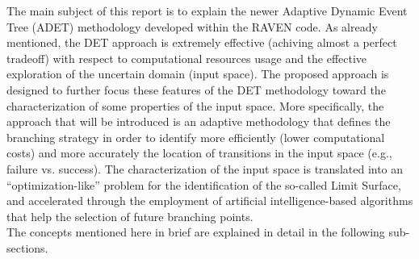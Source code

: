 \label{sec:DETRavenApproach}
The main subject of this report is to explain the newer Adaptive Dynamic Event Tree (ADET) methodology developed within the RAVEN code. As already mentioned, the DET approach is extremely effective (achiving almost a perfect tradeoff) with respect to computational resources usage and the effective exploration of the uncertain domain (input space). The proposed approach is designed to further focus these features of the DET methodology toward the characterization of some properties of the input space. More specifically, the approach that will be introduced is an adaptive methodology that defines the branching strategy in order to identify more efficiently (lower computational costs) and more accurately the location of transitions in the input space (e.g., failure vs. success). The characterization of the input space is translated into an “optimization-like” problem for the identification of the so-called Limit Surface, and accelerated through the employment of artificial intelligence-based algorithms that help the selection of future branching points.
\\ The concepts mentioned here in brief are explained in detail in the following sub-sections.
